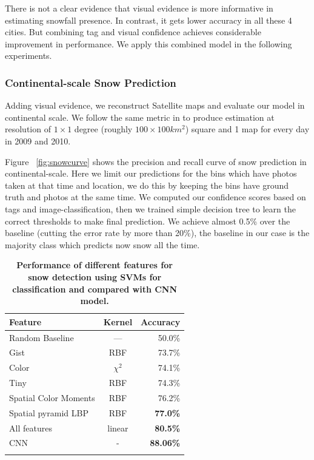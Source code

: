 There is not a clear evidence that visual evidence is more informative in estimating snowfall 
presence. In contrast, it gets lower accuracy in all these 4 cities. But combining tag and visual 
confidence achieves considerable improvement in performance. We apply this combined model 
in the following experiments.

\subsubsection{Continental-scale Snow Prediction}
Adding visual evidence, we reconstruct Satellite maps and 
evaluate our model in continental scale. We follow the same metric in  to produce 
estimation at resolution of $1 \times 1$ degree (roughly $100 \times 100 km^2$) square and 1 map for 
every day in 2009 and 2010.

Figure ~\ref{fig:snowcurve} shows the precision and recall curve of snow prediction in 
continental-scale.
Here we limit our predictions for the bins which have photos taken at that 
time and location, we do this by keeping the bins have ground truth and photos at the same time. 
We computed our confidence scores based on tags and image-classification, then we trained 
simple decision tree to learn the correct thresholds to make final prediction. We achieve 
almost 0.5\% over the baseline (cutting the error rate by more than 20\%), the baseline in 
our case is the majority class which predicts now snow all the time. 



\begin{table}\centering
\caption{\textbf{Performance of different features for snow detection using SVMs for classification and compared with CNN model.}}
\label{tab:snow}
\begin{tabular}{@{}lcr@{}}\toprule
Feature & Kernel & Accuracy\\\midrule
Random Baseline & --- & 50.0\%\\
Gist & RBF & 73.7\%\\
Color  & $\chi^2$ & 74.1\%\\
Tiny & RBF & 74.3\%\\
Spatial Color Moments & RBF & 76.2\%\\
Spatial pyramid LBP & RBF &\textbf{77.0\%}\\\midrule
All features  & linear & \textbf{80.5\%}\\
CNN& -& \textbf{88.06\%}\\
\bottomrule\\
\end{tabular}
\end{table}


